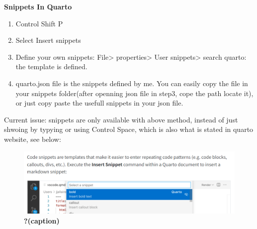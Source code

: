 \documentclass[
  letterpaper,
  DIV=11,
  numbers=noendperiod]{scrartcl}
\providecommand{\tightlist}{%
  \setlength{\itemsep}{0pt}\setlength{\parskip}{0pt}}\usepackage{longtable,booktabs,array}
\begin{document}
\textbf{Snippets In Quarto}

\begin{enumerate}
\def\labelenumi{\arabic{enumi}.}
\tightlist
\item
  Control Shift P
\item
  Select Insert snippets
\item
  Define your own snippets: File\textgreater{} properties\textgreater{}
  User snippets\textgreater{} search quarto: the template is defined.
\item
  quarto.json file is the snippets defined by me. You can easily copy
  the file in your snippets folder(after openning json file in step3,
  cope the path locate it), or just copy paste the usefull snippets in
  your json file.
\end{enumerate}

Current issue: snippets are only available with above method, instead of
just shwoing by typying or using Control Space, which is also what is
stated in quarto website, see below:

\begin{figure}

{\centering 

\includegraphics{img/snippet.png}

}

\caption{\label{fig-axis}\textbf{?(caption)}}

\end{figure}
\end{document}
